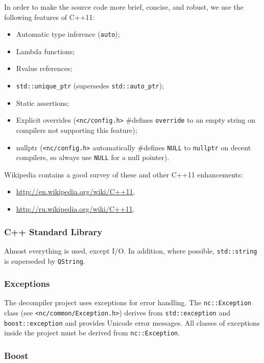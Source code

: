 \documentclass[a4paper,12pt]{article}
\newcommand{\ident}[1]{\texttt{#1}}
\begin{document}
In order to make the source code more brief, concise, and robust, we use the following features of C++11:
\begin{itemize}
\item Automatic type inference (\ident{auto});
\item Lambda functions;
\item Rvalue references;
\item \ident{std::unique\_ptr} (supersedes \ident{std::auto\_ptr});
\item Static assertions;
\item Explicit overrides (\verb|<nc/config.h>| \#defines \ident{override} to an empty string on compilers not supporting this feature);
\item nullptr (\verb|<nc/config.h>| automatically \#defines \ident{NULL} to \ident{nullptr} on decent compilers, so always use \ident{NULL} for a null pointer).
\end{itemize}

Wikipedia contains a good survey of these and other C++11 enhancements:
\begin{itemize}
\item \url{http://en.wikipedia.org/wiki/C++11},
\item \url{http://ru.wikipedia.org/wiki/C++11}.
\end{itemize}

\subsubsection{C++ Standard Library}

Almost everything is used, except I/O.
In addition, where possible, \ident{std::string} is superseded by \ident{QString}.

\subsubsection{Exceptions}

The decompiler project uses exceptions for error handling.
The \ident{nc::Exception} class (see \verb|<nc/common/Exception.h>|) derives from \ident{std::exception} and \ident{boost::exception} and provides Unicode error messages.
All classes of exceptions inside the project must be derived from \ident{nc::Exception}.

\subsubsection{Boost}
\end{document}
